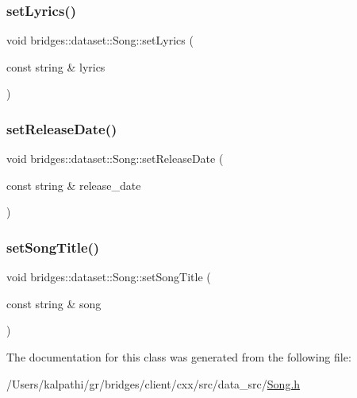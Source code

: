 \mbox{\label{classbridges_1_1dataset_1_1_song_a1ec794f19e791366b9af9df132d4a4b5}} 
\subsubsection{\texorpdfstring{set\+Lyrics()}{setLyrics()}}
{\footnotesize\ttfamily void bridges\+::dataset\+::\+Song\+::set\+Lyrics (\begin{DoxyParamCaption}\item[{const string \&}]{lyrics }\end{DoxyParamCaption})\hspace{0.3cm}{\ttfamily [inline]}}

\mbox{\label{classbridges_1_1dataset_1_1_song_ab40e43ae94ffc57d2f036769d807a144}} 
\subsubsection{\texorpdfstring{set\+Release\+Date()}{setReleaseDate()}}
{\footnotesize\ttfamily void bridges\+::dataset\+::\+Song\+::set\+Release\+Date (\begin{DoxyParamCaption}\item[{const string \&}]{release\+\_\+date }\end{DoxyParamCaption})\hspace{0.3cm}{\ttfamily [inline]}}

\mbox{\label{classbridges_1_1dataset_1_1_song_aa707a5a8905585643893b6c71bf5e299}} 
\subsubsection{\texorpdfstring{set\+Song\+Title()}{setSongTitle()}}
{\footnotesize\ttfamily void bridges\+::dataset\+::\+Song\+::set\+Song\+Title (\begin{DoxyParamCaption}\item[{const string \&}]{song }\end{DoxyParamCaption})\hspace{0.3cm}{\ttfamily [inline]}}



The documentation for this class was generated from the following file\+:\begin{DoxyCompactItemize}
\item 
/\+Users/kalpathi/gr/bridges/client/cxx/src/data\+\_\+src/\mbox{\hyperlink{_song_8h}{Song.\+h}}\end{DoxyCompactItemize}
